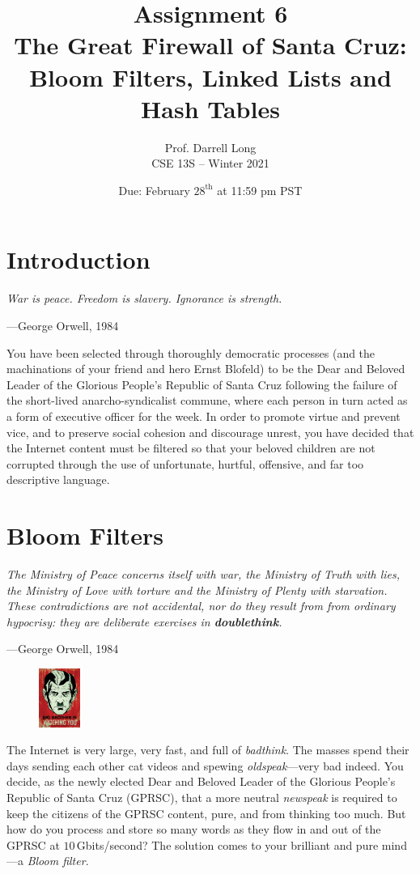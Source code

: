 \documentclass{article}
\title{Assignment 6\\The Great Firewall of Santa Cruz:\\Bloom Filters,
Linked Lists and Hash Tables}
\author{Prof. Darrell Long \\
CSE 13S -- Winter 2021}
\date{Due: February $28^\text{th}$ at 11:59 pm PST}
\begin{document}
\maketitle

\section{Introduction}

\textwidth \epigraph{\emph{War is peace. Freedom
is slavery. Ignorance is strength.}}{---George Orwell, 1984}

\noindent You have been selected through thoroughly democratic processes
(and the machinations of your friend and hero Ernst Blofeld) to be the
Dear and Beloved Leader of the Glorious People's Republic of Santa Cruz
following the failure of the short-lived anarcho-syndicalist commune,
where each person in turn acted as a form of executive officer for the
week. In order to promote virtue and prevent vice, and to preserve
social cohesion and discourage unrest, you have decided that the
Internet content must be filtered so that your beloved children are not
corrupted through the use of unfortunate, hurtful, offensive, and far
too descriptive language.


\section{Bloom Filters}

\textwidth
\epigraph{\emph{The Ministry of Peace concerns itself with war, the Ministry
of Truth with lies, the Ministry of Love with torture and the Ministry of
Plenty with starvation. These contradictions are not accidental, nor do they
result from from ordinary hypocrisy: they are deliberate exercises in
\textbf{doublethink}.}}{---George Orwell, 1984}

\begin{figure}
\centering
\includegraphics[width=0.12\textwidth]{1984-Big-Brother.jpg}
\end{figure}

\noindent The Internet is very large, very fast, and full of
\emph{badthink}. The masses spend their days sending each other cat
videos and spewing \emph{oldspeak}---very bad indeed. You decide, as the
newly elected Dear and Beloved Leader of the Glorious People's Republic
of Santa Cruz (GPRSC), that a more neutral \emph{newspeak} is required
to keep the citizens of the GPRSC content, pure, and from thinking too
much. But how do you process and store so many words as they flow in and
out of the GPRSC at $10\,$Gbits/second? The solution comes to your
brilliant and pure mind---a \emph{Bloom filter}.
\end{document}
